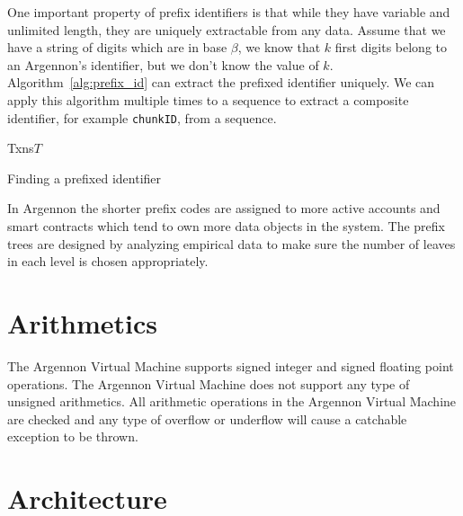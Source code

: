 \documentclass[11pt, a4paper]{report}
\begin{document}
    One important property of prefix identifiers is that while they have variable and unlimited length, they are
    uniquely extractable from any data. Assume that we have a string of digits which are in base $\beta$, we
    know that $k$ first digits belong to an Argennon's identifier, but we don't know the value of $k$.
    Algorithm~\ref{alg:prefix_id} can extract the prefixed identifier uniquely. We can apply this algorithm
    multiple times to a sequence to extract a composite identifier, for example \texttt{chunkID}, from a sequence.

    \begin{algorithm}
        \DontPrintSemicolon
        \SetKwData
        {Txns}{$T$}
        \BlankLine
        {
            {
                \;
            }
        }
        \;
        \caption{Finding a prefixed identifier}\label{alg:prefix_id}
    \end{algorithm}

    In Argennon the shorter prefix codes are assigned to more active accounts and smart contracts which tend to own more
    data objects in the system. The prefix trees are designed by analyzing empirical data to make sure the number
    of leaves in each level is chosen appropriately.


    \section{Arithmetics}\label{sec:arithmetics}

    The Argennon Virtual Machine supports signed integer and signed floating point operations. The Argennon Virtual
    Machine does not support any type of unsigned arithmetics. All arithmetic operations in the Argennon Virtual Machine
    are checked and any type of overflow or underflow will cause a catchable exception to be thrown.

    \section{Architecture}\label{sec:arch}
\end{document}
